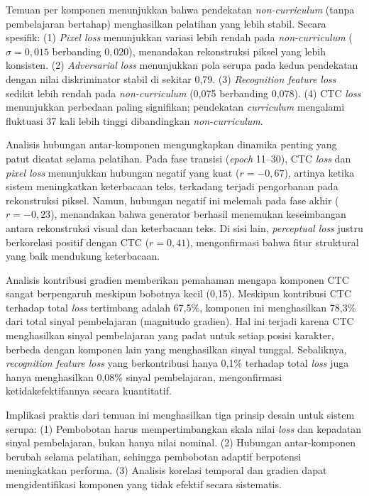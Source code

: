 \begin{enumerate}[leftmargin=1.5em, labelsep=0.5em, itemindent=0pt, label=\arabic*., topsep=0pt, partopsep=0pt]
    Temuan per komponen menunjukkan bahwa pendekatan \textit{non-curriculum} (tanpa pembelajaran bertahap) menghasilkan pelatihan yang lebih stabil. Secara spesifik: (1) \textit{Pixel loss} menunjukkan variasi lebih rendah pada \textit{non-curriculum} ($\sigma = 0,015$ berbanding $0,020$), menandakan rekonstruksi piksel yang lebih konsisten. (2) \textit{Adversarial loss} menunjukkan pola serupa pada kedua pendekatan dengan nilai diskriminator stabil di sekitar 0,79. (3) \textit{Recognition feature loss} sedikit lebih rendah pada \textit{non-curriculum} (0,075 berbanding 0,078). (4) CTC \textit{loss} menunjukkan perbedaan paling signifikan; pendekatan \textit{curriculum} mengalami fluktuasi 37 kali lebih tinggi dibandingkan \textit{non-curriculum}.

    Analisis hubungan antar-komponen mengungkapkan dinamika penting yang patut dicatat selama pelatihan. Pada fase transisi (\textit{epoch} 11--30), CTC \textit{loss} dan \textit{pixel loss} menunjukkan hubungan negatif yang kuat ($r = -0,67$), artinya ketika sistem meningkatkan keterbacaan teks, terkadang terjadi pengorbanan pada rekonstruksi piksel. Namun, hubungan negatif ini melemah pada fase akhir ($r = -0,23$), menandakan bahwa generator berhasil menemukan keseimbangan antara rekonstruksi visual dan keterbacaan teks. Di sisi lain, \textit{perceptual loss} justru berkorelasi positif dengan CTC ($r = 0,41$), mengonfirmasi bahwa fitur struktural yang baik mendukung keterbacaan.

    Analisis kontribusi gradien memberikan pemahaman mengapa komponen CTC sangat berpengaruh meskipun bobotnya kecil (0,15). Meskipun kontribusi CTC terhadap total \textit{loss} tertimbang adalah 67,5\%, komponen ini menghasilkan 78,3\% dari total sinyal pembelajaran (magnitudo gradien). Hal ini terjadi karena CTC menghasilkan sinyal pembelajaran yang padat untuk setiap posisi karakter, berbeda dengan komponen lain yang menghasilkan sinyal tunggal. Sebaliknya, \textit{recognition feature loss} yang berkontribusi hanya 0,1\% terhadap total \textit{loss} juga hanya menghasilkan 0,08\% sinyal pembelajaran, mengonfirmasi ketidakefektifannya secara kuantitatif.

    Implikasi praktis dari temuan ini menghasilkan tiga prinsip desain untuk sistem serupa: (1) Pembobotan harus mempertimbangkan skala nilai \textit{loss} dan kepadatan sinyal pembelajaran, bukan hanya nilai nominal. (2) Hubungan antar-komponen berubah selama pelatihan, sehingga pembobotan adaptif berpotensi meningkatkan performa. (3) Analisis korelasi temporal dan gradien dapat mengidentifikasi komponen yang tidak efektif secara sistematis.


\end{enumerate}
